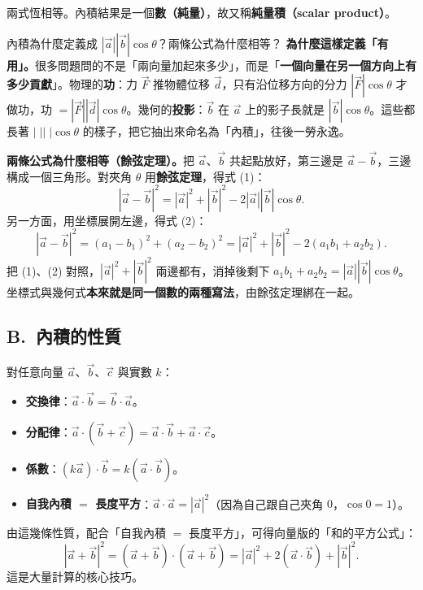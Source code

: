 \documentclass[11pt]{article}
\begin{document}
兩式恆相等。內積結果是一個\textbf{數（純量）}，故又稱\textbf{純量積（scalar product）}。


\begin{補充框}{內積為什麼定義成 $|\vec a||\vec b|\cos\theta$？兩條公式為什麼相等？}
\textbf{為什麼這樣定義「有用」。}很多問題問的不是「兩向量加起來多少」，而是「\textbf{一個向量在另一個方向上有多少貢獻}」。物理的\textbf{功}：力 $\vec F$ 推物體位移 $\vec d$，只有沿位移方向的分力 $|\vec F|\cos\theta$ 才做功，功 $=|\vec F||\vec d|\cos\theta$。幾何的\textbf{投影}：$\vec b$ 在 $\vec a$ 上的影子長就是 $|\vec b|\cos\theta$。這些都長著 $|\;||\;|\cos\theta$ 的樣子，把它抽出來命名為「內積」，往後一勞永逸。

\textbf{兩條公式為什麼相等（餘弦定理）。}把 $\vec a$、$\vec b$ 共起點放好，第三邊是 $\vec a-\vec b$，三邊構成一個三角形。對夾角 $\theta$ 用\textbf{餘弦定理}，得式 (1)：
$$|\vec a-\vec b|^2=|\vec a|^2+|\vec b|^2-2|\vec a||\vec b|\cos\theta.$$
另一方面，用坐標展開左邊，得式 (2)：
$$|\vec a-\vec b|^2=(a_1-b_1)^2+(a_2-b_2)^2=|\vec a|^2+|\vec b|^2-2(a_1b_1+a_2b_2).$$
把 (1)、(2) 對照，$|\vec a|^2+|\vec b|^2$ 兩邊都有，消掉後剩下 $a_1b_1+a_2b_2=|\vec a||\vec b|\cos\theta$。坐標式與幾何式\textbf{本來就是同一個數的兩種寫法}，由餘弦定理綁在一起。
\end{補充框}

\subsection*{\sffamily B.\ 內積的性質}

對任意向量 $\vec a$、$\vec b$、$\vec c$ 與實數 $k$：

\begin{itemize}\setlength{\itemsep}{1pt}
\item \textbf{交換律}：$\vec a\cdot\vec b=\vec b\cdot\vec a$。
\item \textbf{分配律}：$\vec a\cdot(\vec b+\vec c)=\vec a\cdot\vec b+\vec a\cdot\vec c$。
\item \textbf{係數}：$(k\vec a)\cdot\vec b=k(\vec a\cdot\vec b)$。
\item \textbf{自我內積 $=$ 長度平方}：$\vec a\cdot\vec a=|\vec a|^2$（因為自己跟自己夾角 $0$，$\cos0=1$）。
\end{itemize}

由這幾條性質，配合「自我內積 $=$ 長度平方」，可得向量版的「和的平方公式」：
$$|\vec a+\vec b|^2=(\vec a+\vec b)\cdot(\vec a+\vec b)=|\vec a|^2+2(\vec a\cdot\vec b)+|\vec b|^2.$$
這是大量計算的核心技巧。
\end{document}
